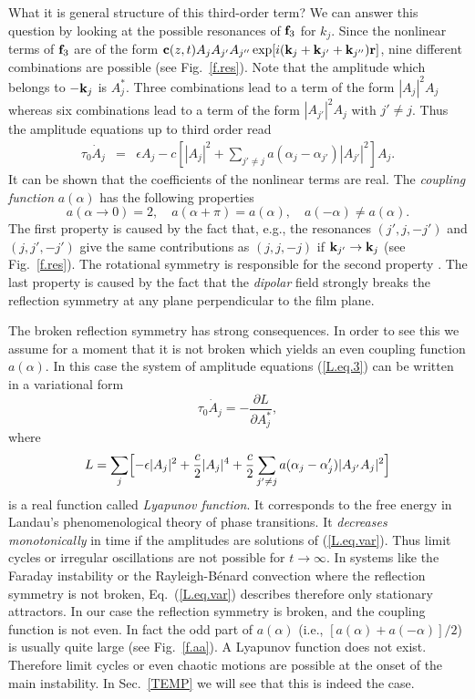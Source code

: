 What it is general structure of this third-order term? We can answer 
this question by looking at the possible resonances of ${\bf f}_3$
for $k_j$. Since the nonlinear terms of ${\bf f}_3$ are of the form
${\bf c}(z,t)A_j A_{j'}A_{j''}\exp[i({\bf k}_j+{\bf k}_{j'}+{\bf
k}_{j''}){\bf r}]$, nine different combinations are possible (see
Fig.~\ref{f.res}). Note that the amplitude which belongs to $-{\bf
k}_j$ is $A_j^*$. Three combinations lead to a term of the form
$|A_j|^2A_j$ whereas six combinations lead to a term of the form
$|A_{j'}|^2A_j$ with $j'\not=j$. Thus the amplitude equations up to
third order read
\begin{eqnarray}
  \tau_0\dot{A}_j&=&\epsilon A_j-c\left[|A_j|^2+\sum\limits_{j'\not=
   j}a(\alpha_j-\alpha_{j'})|A_{j'}|^2\right]A_j.
  \label{L.eq.3}
\end{eqnarray}
It can be shown that the coefficients of the nonlinear terms are real. 
The {\em coupling function\/} $a(\alpha)$ has the following properties
\begin{equation}
  a(\alpha\to 0)=2,\quad a(\alpha+\pi)=a(\alpha),\quad a(-\alpha)
   \not=a(\alpha).
  \label{a.prop}
\end{equation}
The first property is caused by the fact that, e.g., the resonances
$(j',j,-j')$ and $(j,j',-j')$ give the same contributions as
$(j,j,-j)$ if ${\bf k}_{j'}\to{\bf k}_j$ (see Fig.~\ref{f.res}). The
rotational symmetry is responsible for the second property
\cite{rem6}. The last property is caused by the fact that the {\em
dipolar\/} field strongly breaks the reflection symmetry at any plane
perpendicular to the film plane. 

The broken reflection symmetry has strong consequences. In order to
see this we assume for a moment that it is not broken which yields an
even coupling function $a(\alpha)$. In this case the system of
amplitude equations (\ref{L.eq.3}) can be written in a variational
form
\begin{equation}
  \tau_0\dot{A}_j=-\frac{\partial L}{\partial A_j^*},
  \label{L.eq.var}
\end{equation}
where
\begin{equation}
  L=\sum\limits_j\Bigl[-\epsilon|A_j|^2+\frac{c}{2}|A_j|^4+\frac{c}
   {2}\sum\limits_{j'\not=j}a(\alpha_j-\alpha_j')|A_{j'}A_j|^2\Bigr]
  \label{L.fct}
\end{equation}
is a real function called {\em Lyapunov function\/}. It corresponds
to the free energy in Landau's phenomenological theory of phase
transitions. It {\em decreases monotonically\/} in time if the
amplitudes are solutions of (\ref{L.eq.var}). Thus limit cycles or
irregular oscillations are not possible for $t\to\infty$. In systems
like the Faraday instability or the Rayleigh-B\'enard convection
where the reflection symmetry is not broken, Eq.~(\ref{L.eq.var})
describes therefore only stationary attractors. In our case the
reflection symmetry is broken, and the coupling function is not even.
In fact the odd part of $a(\alpha)$ (i.e.,
$[a(\alpha)+a(-\alpha)]/2$) is usually quite large (see
Fig.~\ref{f.aa}). A Lyapunov function does not exist. Therefore limit
cycles or even chaotic motions are possible at the onset of the main
instability. In Sec.~\ref{TEMP} we will see that this is indeed the
case.

